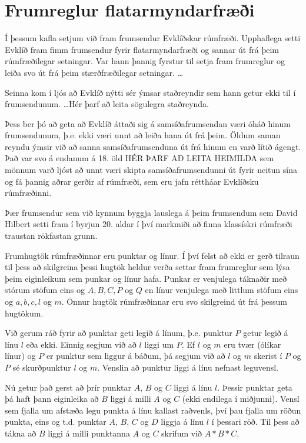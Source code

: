 \section{Frumreglur flatarmyndarfræði}

Í þessum kafla setjum við fram frumsendur Evklíðskar rúmfræði. Upphaflega setti Evklíð fram fimm frumsendur fyrir flatarmyndarfræði og sannar út frá þeim rúmfræðilegar setningar. Var hann þannig fyrstur til setja fram frumreglur og leiða svo út frá þeim stærðfræðilegar setningar. \ldots

Seinna kom í ljós að Evklíð nýtti sér ýmsar staðreyndir sem hann getur ekki til í frumsendunum. \ldots Hér þarf að leita sögulegra staðreynda.

Þess ber þó að geta að Evklíð áttaði sig á samsíðafrumsendan væri óháð hinum frumsendunum, þ.e. ekki væri unnt að leiða hana út frá þeim. Öldum saman reyndu ýmsir við að sanna samsíðafrumsenduna út frá hinum en varð lítið ágengt. Það var svo á endanum á 18. öld HÉR ÞARF AÐ LEITA HEIMILDA sem mönnum varð ljóst að unnt væri skipta samsíðafrumsendunni út fyrir neitun sína og fá þannig aðrar gerðir af rúmfræði, sem eru jafn réttháar Evklíðsku rúmfræðinni.

Þær frumsendur sem við kynnum byggja lauslega á þeim frumsendum sem David Hilbert setti fram í byrjun 20. aldar í því markmiði að finna klassískri rúmfræði traustan rökfastan grunn.

Frumhugtök rúmfræðinnar eru punktar og línur. Í því felst að ekki er gerð tilraun til þess að skilgreina þessi hugtök heldur verða settar fram frumreglur sem lýsa þeim eiginleikum sem punkar og línur hafa. Punkar er venjulega táknaðir með stórum stöfum eins og $A,B,C,P$ og $Q$ en línur venjulega með littlum stöfum eins og $a,b,c,l$ og $m$. Önnur hugtök rúmfræðinnar eru svo skilgreind út frá þessum hugtökum.

Við gerum ráð fyrir að punktar geti legið á línum, þ.e. punktur $P$ getur legið á línu $l$ eða ekki. Einnig segjum við að $l$ liggi um $P$. Ef $l$ og $m$ eru tvær (ólíkar línur) og $P$ er punktur sem liggur á báðum, þá segjum við að $l$ og $m$ skerist í $P$ og $P$ sé skurðpunktur $l$ og $m$. Venslin að punktur liggi á línu nefnast leguvensl.

Nú getur það gerst að þrír punktar $A$, $B$ og $C$ liggi á línu $l$. Þessir punktar geta þá haft þann eiginleika að $B$ liggi á milli $A$ og $C$ (ekki endilega í miðjunni). Vensl sem fjalla um afstæða legu punkta á línu kallast raðvenls, því þau fjalla um röðun punkta, eins og t.d. punktar $A$, $B$, $C$ og $D$ liggja á línu $l$ í þessari röð. Til þess að tákna að $B$ liggi á milli punktanna $A$ og $C$ skrifum við $A*B*C$.

